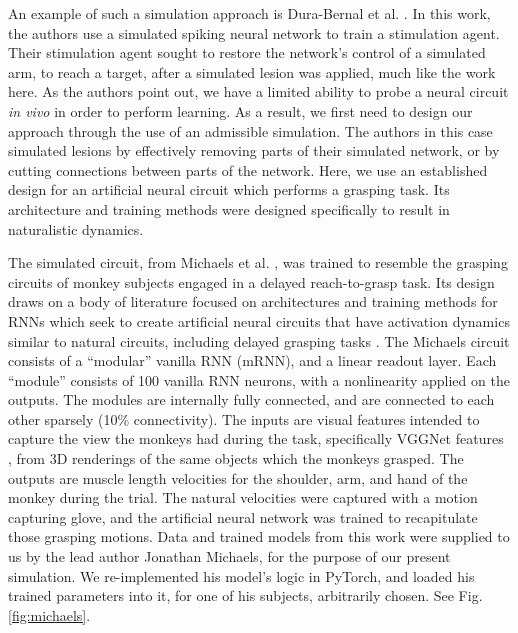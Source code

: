 \documentclass[12pt]{iopart}
\begin{document}
An example of such a simulation approach is Dura-Bernal et al. \cite{bernal.sim}. In this work, the
authors use a simulated spiking neural network to train a stimulation agent.
Their stimulation agent sought to restore the network's
control of a simulated arm, to reach a target, after a simulated lesion was applied,
much like the work here.  As the authors point out, we have a limited ability to
probe a neural circuit \textit{in vivo} in order to perform learning. As a result,
we first need to design our approach through the use of an admissible simulation.
The authors in this case simulated lesions by effectively removing parts of their
simulated network, or by cutting connections between parts of the network.
Here, we use an established design for an artificial neural circuit which
performs a grasping task. Its architecture and training methods were designed
specifically to result in naturalistic dynamics.

The simulated circuit, from Michaels et al. \cite{michaels.mrnn}, was trained
to resemble the grasping circuits of monkey subjects engaged in a delayed reach-to-grasp task.
Its design draws on a body of literature focused on architectures and training methods for RNNs which
seek to create artificial neural circuits that have activation dynamics similar to natural circuits,
including delayed grasping tasks \cite{susillo.mrnn}. The Michaels circuit consists of a
``modular'' vanilla RNN (mRNN), and a linear readout layer. Each ``module'' consists of 100 vanilla
RNN neurons, with a nonlinearity applied on the outputs. The modules are internally fully connected,
and are connected to each other sparsely (10\% connectivity). The inputs are visual features
intended to capture the view the monkeys had during the task, specifically VGGNet features \cite{simonyan.vgg},
from 3D renderings of the same objects which the monkeys grasped. The outputs are muscle length
velocities for the shoulder, arm, and hand of the monkey during the trial. The natural
velocities were captured with a motion capturing glove, and the artificial neural network
was trained to recapitulate those grasping motions. Data and trained models from this work
were supplied to us by the lead author Jonathan Michaels, for the purpose of our present
simulation. We re-implemented his model's logic in PyTorch, and loaded his trained parameters
into it, for one of his subjects, arbitrarily chosen. See Fig. \ref{fig:michaels}.
\end{document}
